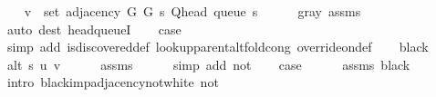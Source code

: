 \begin{isabellebody}
\ \ \isamarkupfalse%
\ {\isachardoublequoteopen}v\ {\isasymin}\ set\ {\isacharparenleft}{\kern0pt}adjacency\ G{}\ G{}\ s\ {\isacharparenleft}{\kern0pt}Q{\isacharunderscore}{\kern0pt}head\ {\isacharparenleft}{\kern0pt}queue\ s{\isacharparenright}{\kern0pt}{\isacharparenright}{\kern0pt}{\isacharparenright}{\kern0pt}{\isachardoublequoteclose}\isanewline
\ \ \ \ \isamarkupfalse%
\ gray\ assms{\isacharparenleft}{\kern0pt}{}{\isacharparenright}{\kern0pt}\isanewline
\ \ \ \ \isamarkupfalse%
\ {\isacharparenleft}{\kern0pt}auto\ dest{\isacharcolon}{\kern0pt}\ head{\isacharunderscore}{\kern0pt}queueI{\isacharparenright}{\kern0pt}\isanewline
\ \ \isamarkupfalse%
\ {\isacharquery}{\kern0pt}case\isanewline
\ \ \ \ \isamarkupfalse%
\ {\isacharparenleft}{\kern0pt}simp\ add{\isacharcolon}{\kern0pt}\ is{\isacharunderscore}{\kern0pt}discovered{\isacharunderscore}{\kern0pt}def\ lookup{\isacharunderscore}{\kern0pt}parent{\isacharunderscore}{\kern0pt}alt{\isacharunderscore}{\kern0pt}fold{\isacharunderscore}{\kern0pt}cong\ override{\isacharunderscore}{\kern0pt}on{\isacharunderscore}{\kern0pt}def{\isacharparenright}{\kern0pt}\isanewline
{}\isamarkupfalse%
\isanewline
\ \ \isamarkupfalse%
\ black\isanewline
\ \ \isamarkupfalse%
\ {\isachardoublequoteopen}alt\ s\ u\ v{\isachardoublequoteclose}\isanewline
\ \ \ \ \isamarkupfalse%
\ assms{\isacharparenleft}{\kern0pt}{}{\isacharparenright}{\kern0pt}\isanewline
\ \ \ \ \isamarkupfalse%
\ {\isacharparenleft}{\kern0pt}simp\ add{\isacharcolon}{\kern0pt}\ not{\isacharunderscore}{\kern0pt}{\isacharparenleft}{\kern0pt}{}{\isacharparenright}{\kern0pt}{\isacharparenright}{\kern0pt}\isanewline
\ \ \isamarkupfalse%
\ {\isacharquery}{\kern0pt}case\isanewline
\ \ \ \ \isamarkupfalse%
\ assms{\isacharparenleft}{\kern0pt}{}{\isacharparenright}{\kern0pt}\ black\isanewline
\ \ \ \ \isamarkupfalse%
\ {\isacharparenleft}{\kern0pt}intro\ black{\isacharunderscore}{\kern0pt}imp{\isacharunderscore}{\kern0pt}adjacency{\isacharunderscore}{\kern0pt}not{\isacharunderscore}{\kern0pt}white\ not{\isacharunderscore}{\kern0pt}{\isacharparenleft}{\kern0pt}{}{\isacharparenright}{\kern0pt}{\isacharparenright}{\kern0pt}\isanewline
{}\isamarkupfalse%
%
\endisatagproof
{\isafoldproof}%
%
\isadelimproof
%
\endisadelimproof
%
\isadelimdocument
%
\endisadelimdocument

\end{isabellebody}
